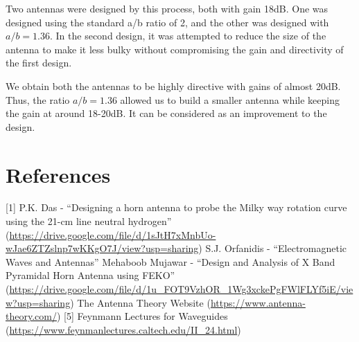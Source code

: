 \documentclass[12pt]{article}
\begin{document}
Two antennas were designed by this process, both with gain 18dB. One was designed using the standard a/b ratio of 2, and the other was designed with $a/b=1.36$. In the second design, it was attempted to reduce the size of the antenna to make it less bulky without compromising the gain and directivity of the first design. \linebreak

We obtain both the antennas to be highly directive with gains of almost 20dB. Thus, the ratio $a/b=1.36$ allowed us to build a smaller antenna while keeping the gain at around 18-20dB. It can be considered as an improvement to the design.

\newpage
\section{References}
[1] P.K. Das - ``Designing a horn antenna to probe the Milky way rotation curve using the 21-cm line neutral hydrogen'' (\url{https://drive.google.com/file/d/1sJtH7xMnbUo-wJae6ZTZslnp7wKKgO7J/view?usp=sharing}) \linebreak
[2] S.J. Orfanidis - ``Electromagnetic Waves and Antennas'' \linebreak
[3] Mehaboob Mujawar - ``Design and Analysis of X Band Pyramidal Horn Antenna using FEKO'' (\url{https://drive.google.com/file/d/1u_FOT9VzhOR_1Wg3xckePgFWlFLYf5iE/view?usp=sharing}) \linebreak
[4] The Antenna Theory Website (\url{https://www.antenna-theory.com/})
[5] Feynmann Lectures for Waveguides (\url{https://www.feynmanlectures.caltech.edu/II_24.html})
\end{document}

